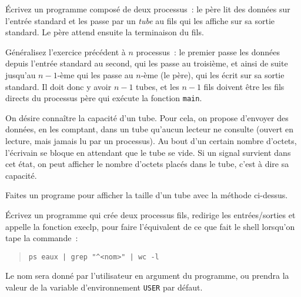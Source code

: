 %


% 


\question
    \label {q:tube1}

Écrivez un programme composé de deux processus~: le père lit des
données sur l'entrée standard et les passe par un {\em tube} au fils
qui les affiche sur sa sortie standard. Le père attend ensuite la
terminaison du fils.


\question

Généralisez l'exercice précédent à $n$ processus~:  le premier passe les
données depuis l'entrée standard au second, qui les passe au troisième,
et ainsi de suite jusqu'au $n-1$-ème qui les passe au $n$-ème (le père),
qui les écrit sur sa sortie standard. Il doit donc y avoir $n-1$ tubes,
et les $n-1$ fils doivent être les fils directs du processus père qui
exécute la fonction \texttt{main}.


\question

On désire connaître la capacité d'un tube.  Pour cela, on propose
d'envoyer des données, en les comptant, dans un tube qu'aucun lecteur ne
consulte (ouvert en lecture, mais jamais lu par un processus).  Au bout
d'un certain nombre d'octets, l'écrivain se bloque en attendant que le
tube se vide.  Si un signal survient dans cet état, on peut afficher le
nombre d'octets placés dans le tube, c'est à dire sa capacité.

Faites un programe pour afficher la taille d'un tube avec la méthode
ci-dessus.


\question

Écrivez un programme qui crée deux processus fils, redirige les
entrées/sorties et appelle la fonction execlp, pour faire l'équivalent
de ce que fait le shell lorsqu'on tape la commande~:

\begin {quote}
    \texttt {ps eaux | grep "\^{ }<nom>" | wc -l}
\end {quote}

Le nom sera donné par l'utilisateur en argument du programme, ou
prendra la valeur de la variable d'environnement {\tt USER} par défaut.

